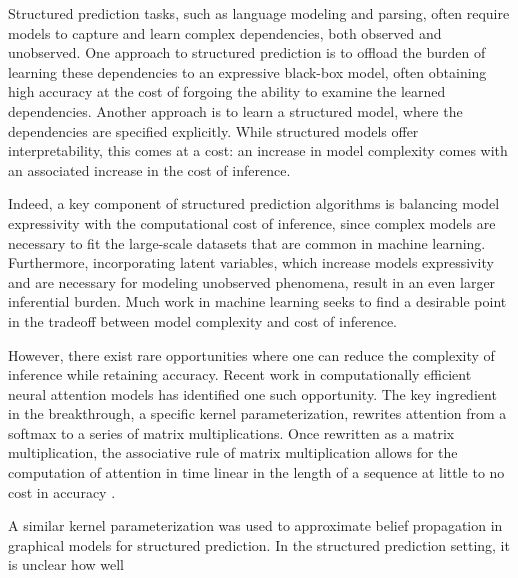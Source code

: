 
Structured prediction tasks, such as language modeling and parsing, often require models to capture and learn complex dependencies, both observed and unobserved.
One approach to structured prediction is to offload the burden of learning these dependencies to an expressive black-box  model, often obtaining high accuracy at the cost of forgoing the ability to examine the learned dependencies.
Another approach is to learn a structured model, where the dependencies are specified explicitly.
While structured models offer interpretability, this comes at a cost: an increase in model complexity comes with an associated increase in the cost of inference.

Indeed, a key component of structured prediction algorithms is balancing model expressivity with the computational cost of inference, since complex models are necessary to fit the large-scale datasets that are common in machine learning.
Furthermore, incorporating latent variables, which increase models expressivity and are necessary for modeling unobserved phenomena, result in an even larger inferential burden.
Much work in machine learning seeks to find a desirable point in the tradeoff between model complexity and cost of inference.

However, there exist rare opportunities where one can reduce the complexity of inference while retaining accuracy.
Recent work in computationally efficient neural attention models  has identified one such opportunity.
The key ingredient in the breakthrough, a specific kernel parameterization, rewrites attention from a softmax to a series of matrix multiplications. Once rewritten as a matrix multiplication, the associative rule of matrix multiplication allows for the computation of attention in time linear in the length of a sequence at little to no cost in accuracy \citep{peng2021rfa,choromanski2020performer}.

A similar kernel parameterization was used to approximate belief propagation in graphical models \citep{song2011kernelbp} for structured prediction. In the structured prediction setting, it is unclear how well 


